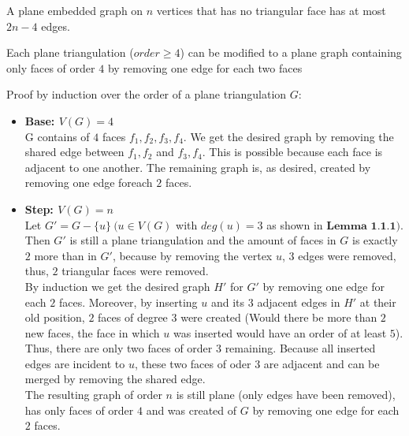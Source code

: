 \documentclass[a4paper]{article}
\begin{document}
	\begin{solution}{19}
		\begin{theorem} {A plane embedded graph on $n$ vertices that has no triangular face has at most $2n-4$ edges.}
			\begin{lemma} {Each plane triangulation ($order \geq 4$) can be modified to a plane graph containing only faces of order $4$ by removing one edge for each two faces}
				
				Proof by induction over the order of a plane triangulation $G$:\\
				\begin{itemize}
					\item \textbf{Base: $V(G)=4$}\\
						G contains of $4$ faces $f_1,f_2,f_3,f_4$. We get the desired graph by removing the shared edge between $f_1, f_2$ and $f_3, f_4$.
						This is possible because each face is adjacent to one another. The remaining graph is, as desired, created by removing one edge foreach $2$ faces.
						
					\item \textbf{Step: $V(G)=n$}\\
						Let $G' = G -\{u\} ~ (u \in V(G)$ with $deg(u) = 3$ as shown in $\textbf{Lemma 1.1.1})$. Then $G'$ is still a plane triangulation and the amount of faces in $G$ is exactly $2$ more than in $G'$, because by removing the vertex $u$, $3$ edges were removed, thus, $2$ triangular faces were removed.\\
						By induction we get the desired graph $H'$ for $G'$ by removing one edge for each $2$ faces. Moreover, by inserting $u$ and its $3$ adjacent edges in $H'$ at their old position, $2$ faces of degree $3$ were created (Would there be more than $2$ new faces, the face in which $u$ was inserted would have an order of at least $5$). Thus, there are only two faces of order $3$ remaining. Because all inserted edges are incident to $u$, these two faces of oder $3$ are adjacent and can be merged by removing the shared edge.\\
						The resulting graph of order $n$ is still plane (only edges have been removed), has only faces of order $4$ and was created of $G$ by removing one edge for each $2$ faces. 
					
				\end{itemize}
			
			\end{lemma}
		

\end{theorem}
\end{solution}
\end{document}
